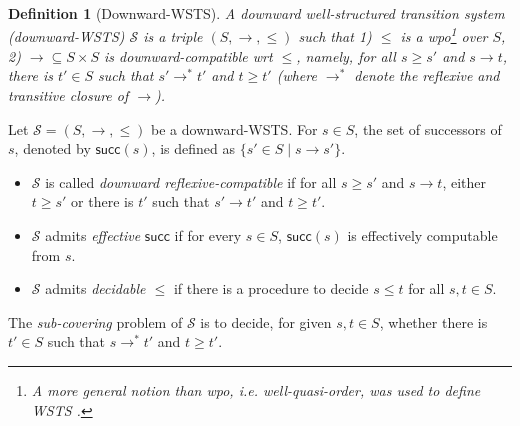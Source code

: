 \documentclass[preprint,12pt]{elsarticle}
\newtheorem{definition}{Definition}
\newtheorem{lemma}[theorem]{Lemma}
\newcommand\Succ{\mathsf{succ}}
\newcommand{\dwsts}{\mathscr{S}}
\begin{document}
%

\begin{definition}[Downward-WSTS]
A downward well-structured transition system (downward-WSTS) $\dwsts$ is a triple $(S, \rightarrow, \le)$ such that 1) $\le$ is a wpo\footnote{A more general notion than wpo, i.e. well-quasi-order, was used to define WSTS \cite{FS01}. } over $S$, 2) $\rightarrow \subseteq S \times S$ is downward-compatible wrt $\le$, namely, for all $s \ge s'$ and $s \rightarrow t$, there is $t' \in S$ such that $s' \rightarrow^* t'$ and $t \ge t'$ (where $ \rightarrow^*$ denote the reflexive and transitive closure of $\rightarrow$).
\end{definition}


Let $\dwsts = (S, \rightarrow, \le)$ be a downward-WSTS. For $s \in S$, the set of successors of $s$, denoted by $\Succ(s)$, is defined as $\{s' \in S \mid s \rightarrow s'\}$.
\begin{itemize}
\item $\dwsts$ is called \emph{downward reflexive-compatible} if for all $s \ge s'$ and $s \rightarrow t$, either $t \ge s'$ or there is $t'$ such that $s' \rightarrow t'$ and $t \ge t'$.
%
\item $\dwsts$ admits \emph{effective} $\Succ$ if for every $s \in S$, $\Succ(s)$ is effectively computable from $s$.
%
\item $\dwsts$ admits \emph{decidable $\le$} if there is a procedure to decide $s \le t$ for all $s, t \in S$.
%
\end{itemize}

The \emph{sub-covering} problem of $\dwsts$ is to decide, for given $s, t \in S$, whether %
there is $t' \in S$ such that $s \rightarrow^* t'$ and $t \ge t'$.
\end{document}
